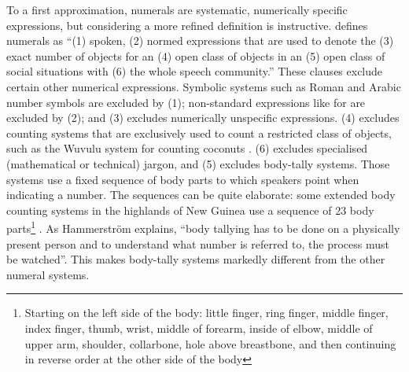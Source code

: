 \documentclass{../src/bcthesispart}
\begin{document}
To a first approximation, numerals are systematic, numerically specific expressions, but considering a more refined definition is instructive.
\textcite{Hammarstrom2009} defines numerals as
“(1) spoken, 
(2) normed expressions that are used to denote the 
(3) exact number of objects for an 
(4) open class of objects in an 
(5) open class of social situations with 
(6) the whole speech community.”
These clauses exclude certain other numerical expressions. 
Symbolic systems such as Roman and Arabic number symbols are excluded by (1); non-standard expressions like  for  are excluded by (2); and 
(3) excludes numerically unspecific expressions.
(4) excludes counting systems that are exclusively used to count a restricted class of objects, such as the Wuvulu system for counting coconuts \parencite{Hammarstrom2009}.
(6) excludes specialised (mathematical or technical) jargon, and (5) excludes body-tally systems.
Those systems use a fixed sequence of body parts to which speakers point when indicating a number.
The sequences can be quite elaborate: some extended body counting systems in the highlands of New Guinea use a sequence of 23 body parts\footnote{%
	Starting on the left side of the body: little finger, ring finger, middle finger, index finger, thumb, wrist, middle of forearm, inside of elbow, middle of upper arm, shoulder, collarbone, hole above breastbone, and then continuing in reverse order at the other side of the body
	} \parencite{Comrie2013}.
As Hammerström explains, “body tallying has to be done on a physically present person and to understand what number is referred to, the process must be watched”.
This makes body-tally systems markedly different from the other numeral systems.
\end{document}
